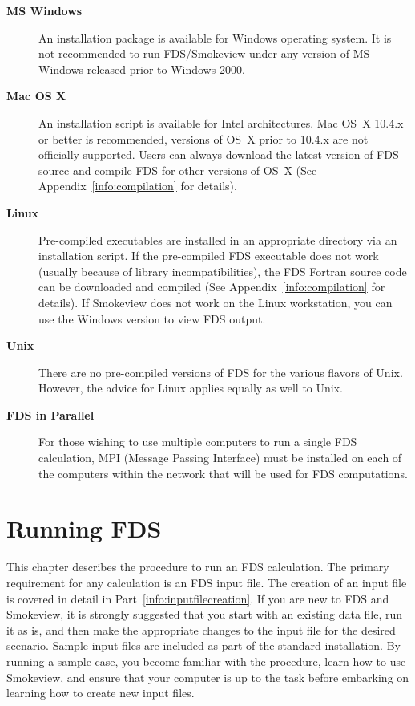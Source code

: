 \documentclass[11pt]{book}
\begin{document}
\begin{description}
\item[{\bf MS Windows}]
An installation package is available for Windows operating system.
It is not recommended to run FDS/Smokeview under any version of MS Windows
released prior to Windows 2000.

\item[{\bf Mac OS X}]
An installation script is available for Intel architectures.
Mac OS~X 10.4.x or better is recommended, versions of OS~X prior to 10.4.x are not
officially supported. Users can always download the latest version of FDS source and
compile FDS for other versions of OS~X (See Appendix~\ref{info:compilation} for details).

\item[{\bf Linux}]
Pre-compiled executables are installed in an appropriate directory via an installation script.
If the pre-compiled FDS executable does not work (usually because of library
incompatibilities), the FDS Fortran source code can be downloaded and compiled
(See Appendix~\ref{info:compilation} for details). If Smokeview does not work on the Linux workstation,
you can use the Windows version to view FDS output.

\item[{\bf Unix}]
There are no pre-compiled versions of FDS for the various flavors of Unix. However, the advice for Linux applies
equally as well to Unix.

\item[{\bf FDS in Parallel}] For those wishing to use multiple computers to run a single FDS calculation,
MPI (Message Passing Interface) must be installed on each of the
computers within the network that will be used for FDS computations.
\end{description}



\chapter{Running FDS}
\label{info:runningFDS}

This chapter describes the procedure to run an FDS calculation.
The primary requirement for any calculation is an FDS input file. The creation of an
input file is covered in detail in Part~\ref{info:inputfilecreation}.
If you are new to FDS and Smokeview, it is strongly suggested that you start with an existing data file, run it as is,
and then make the appropriate changes to the input file for the
desired scenario. Sample input files are included as part of the standard installation.
By running a sample case, you become familiar with the procedure, learn how to use Smokeview, and
ensure that your computer is up to the task before embarking on
learning how to create new input files.
\end{document}
